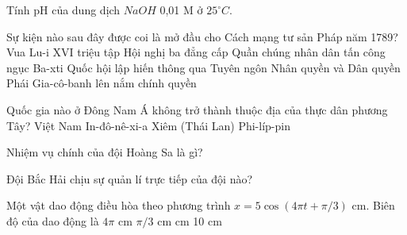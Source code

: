 \begin{ex}
    Tính pH của dung dịch $NaOH$ 0,01 M ở $25^\circ C$.
\end{ex}
\begin{ex}
    Sự kiện nào sau đây được coi là mở đầu cho Cách mạng tư sản Pháp năm 1789?
    \choice
    {Vua Lu-i XVI triệu tập Hội nghị ba đẳng cấp}
    {\True Quần chúng nhân dân tấn công ngục Ba-xti}
    {Quốc hội lập hiến thông qua Tuyên ngôn Nhân quyền và Dân quyền}
    {Phái Gia-cô-banh lên nắm chính quyền}

\end{ex}
\begin{ex}
    Quốc gia nào ở Đông Nam Á không trở thành thuộc địa của thực dân phương Tây?
    \choice
    {Việt Nam}
    {In-đô-nê-xi-a}
    {\True Xiêm (Thái Lan)}
    {Phi-líp-pin}

\end{ex}
\begin{ex}
    \begin{chc}
        Nhiệm vụ chính của đội Hoàng Sa là gì?
    \end{chc}
    \begin{chc}
        Đội Bắc Hải chịu sự quản lí trực tiếp của đội nào?
    \end{chc}
\end{ex}
\begin{ex}
    Một vật dao động điều hòa theo phương trình $x = 5\cos(4\pi t + \pi/3)$ cm. Biên độ của dao động là
    \choice
    {$4\pi$ cm}
    {$\pi/3$ cm}
    { cm}
    {10 cm}

\end{ex}
